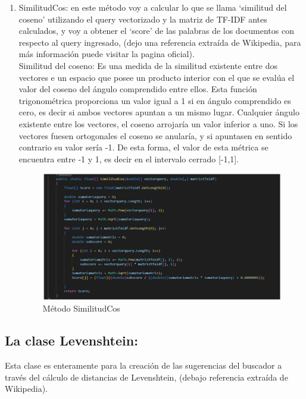 \documentclass[a4paper,12pt]{article}
\begin{document}
\begin{enumerate}
		\item SimilitudCos: en este método voy a calcular lo que se llama ‘similitud del coseno’ utilizando el query vectorizado y la matriz de TF-IDF antes calculados, y voy a obtener el ‘score’ de las palabras de los documentos con respecto al query ingresado, (dejo una referencia extraída de Wikipedia, para más información puede visitar la pagina oficial).\\
		Similitud del coseno: Es una medida de la similitud existente entre dos vectores e un espacio que posee un producto interior con el que se evalúa el valor del coseno del ángulo comprendido entre ellos. Esta función trigonométrica proporciona un valor igual a 1 si en ángulo comprendido es cero, es decir si ambos vectores apuntan a un mismo lugar. Cualquier ángulo existente entre los vectores, el coseno arrojaría un valor inferior a uno. Si los vectores fuesen ortogonales el coseno se anularía, y si apuntasen en sentido contrario su valor sería -1. De esta forma, el valor de esta métrica se encuentra entre -1 y 1, es decir en el intervalo cerrado [-1,1].\\
		\begin{figure}[h]
			\centering
			\includegraphics[width=13cm]{figura7.png}
			\caption{Método SimilitudCos}
		\end{figure}
		
	\end{enumerate}
	
	
	\subsection{La clase Levenshtein:}
	
	Esta clase es enteramente para la creación de las sugerencias del buscador a través del cálculo de distancias de Levenshtein, (debajo referencia extraída de Wikipedia).\\
	
\end{document}
